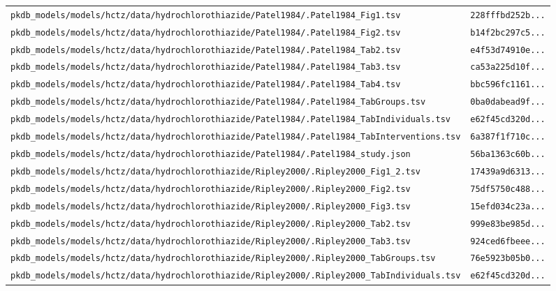 \documentclass{article}
\begin{document}
\begin{longtable}{ll}
\texttt{pkdb\_models/models/hctz/data/hydrochlorothiazide/Patel1984/.Patel1984\_Fig1.tsv} & \texttt{228fffbd252b...} \\
\texttt{pkdb\_models/models/hctz/data/hydrochlorothiazide/Patel1984/.Patel1984\_Fig2.tsv} & \texttt{b14f2bc297c5...} \\
\texttt{pkdb\_models/models/hctz/data/hydrochlorothiazide/Patel1984/.Patel1984\_Tab2.tsv} & \texttt{e4f53d74910e...} \\
\texttt{pkdb\_models/models/hctz/data/hydrochlorothiazide/Patel1984/.Patel1984\_Tab3.tsv} & \texttt{ca53a225d10f...} \\
\texttt{pkdb\_models/models/hctz/data/hydrochlorothiazide/Patel1984/.Patel1984\_Tab4.tsv} & \texttt{bbc596fc1161...} \\
\texttt{pkdb\_models/models/hctz/data/hydrochlorothiazide/Patel1984/.Patel1984\_TabGroups.tsv} & \texttt{0ba0dabead9f...} \\
\texttt{pkdb\_models/models/hctz/data/hydrochlorothiazide/Patel1984/.Patel1984\_TabIndividuals.tsv} & \texttt{e62f45cd320d...} \\
\texttt{pkdb\_models/models/hctz/data/hydrochlorothiazide/Patel1984/.Patel1984\_TabInterventions.tsv} & \texttt{6a387f1f710c...} \\
\texttt{pkdb\_models/models/hctz/data/hydrochlorothiazide/Patel1984/.Patel1984\_study.json} & \texttt{56ba1363c60b...} \\
\texttt{pkdb\_models/models/hctz/data/hydrochlorothiazide/Ripley2000/.Ripley2000\_Fig1\_2.tsv} & \texttt{17439a9d6313...} \\
\texttt{pkdb\_models/models/hctz/data/hydrochlorothiazide/Ripley2000/.Ripley2000\_Fig2.tsv} & \texttt{75df5750c488...} \\
\texttt{pkdb\_models/models/hctz/data/hydrochlorothiazide/Ripley2000/.Ripley2000\_Fig3.tsv} & \texttt{15efd034c23a...} \\
\texttt{pkdb\_models/models/hctz/data/hydrochlorothiazide/Ripley2000/.Ripley2000\_Tab2.tsv} & \texttt{999e83be985d...} \\
\texttt{pkdb\_models/models/hctz/data/hydrochlorothiazide/Ripley2000/.Ripley2000\_Tab3.tsv} & \texttt{924ced6fbeee...} \\
\texttt{pkdb\_models/models/hctz/data/hydrochlorothiazide/Ripley2000/.Ripley2000\_TabGroups.tsv} & \texttt{76e5923b05b0...} \\
\texttt{pkdb\_models/models/hctz/data/hydrochlorothiazide/Ripley2000/.Ripley2000\_TabIndividuals.tsv} & \texttt{e62f45cd320d...} \\

\end{longtable}
\end{document}
